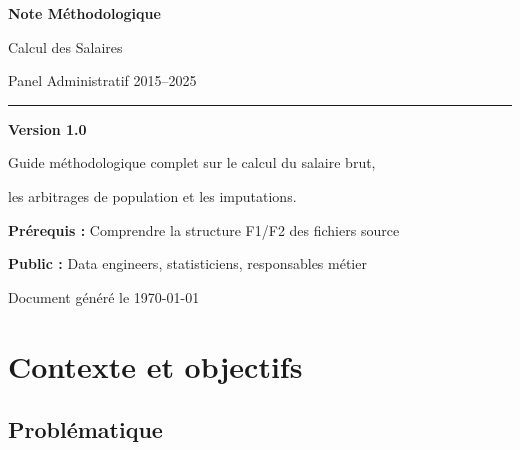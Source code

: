 \documentclass[12pt,a4paper,french]{article}
\begin{document}
\begin{titlepage}
    \centering
    \vspace*{2cm}
    {\huge\bfseries\color{primaryblue}
        Note Méthodologique\par
        \vspace{0.5cm}
        Calcul des Salaires\par
        \vspace{0.3cm}
        Panel Administratif 2015--2025\par
    \par}
    \vspace{1.5cm}
    \textcolor{accentblue}{\rule{10cm}{2pt}}
    \vspace{1cm}

    {\large\bfseries Version 1.0\par}
    \vspace{0.5cm}
    {\large Guide méthodologique complet sur le calcul du salaire brut,\par
           les arbitrages de population et les imputations.\par}
    \vspace{2cm}

    \begin{tcolorbox}[colback=lightblue!40, colframe=primaryblue, width=12cm]
        \centering
        \textbf{Prérequis :} Comprendre la structure F1/F2 des fichiers source\par
        \textbf{Public :} Data engineers, statisticiens, responsables métier\par
    \end{tcolorbox}

    \vfill
    {\small\color{darkgray} Document généré le \today\par}
\end{titlepage}

\newpage

\tableofcontents
\newpage

\section{Contexte et objectifs}

\subsection{Problématique}
\end{document}
